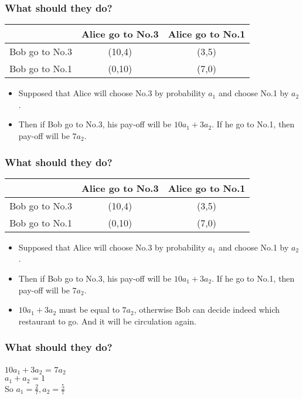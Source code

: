 \documentclass{beamer}
\begin{document}
\begin{frame}
\frametitle{What should they do?}
\begin{tabular}{|c|c|c|}
\hline
\hline
    & {\color{red}Alice} go to No.3 & {\color{red}Alice} go to No.1\\
\hline
{\color{blue}Bob} go to No.3 & ({\color{blue}10},{\color{red}4}) & ({\color{blue}3},{\color{red}5})\\
\hline
{\color{blue}Bob} go to No.1 & ({\color{blue}0},{\color{red}10}) & ({\color{blue}7},{\color{red}0})\\
\hline
\hline
\end{tabular}
\begin{itemize}
\item Supposed that Alice will choose No.3 by probability $a_1$ and choose No.1 by $a_2$.
\item Then if Bob go to No.3, his pay-off will be $10a_1+3a_2$. If he go to No.1, then pay-off will be $7a_2$.
\end{itemize}
\end{frame}

\begin{frame}
\frametitle{What should they do?}
\begin{tabular}{|c|c|c|}
\hline
\hline
    & {\color{red}Alice} go to No.3 & {\color{red}Alice} go to No.1\\
\hline
{\color{blue}Bob} go to No.3 & ({\color{blue}10},{\color{red}4}) & ({\color{blue}3},{\color{red}5})\\
\hline
{\color{blue}Bob} go to No.1 & ({\color{blue}0},{\color{red}10}) & ({\color{blue}7},{\color{red}0})\\
\hline
\hline
\end{tabular}
\begin{itemize}
\item Supposed that Alice will choose No.3 by probability $a_1$ and choose No.1 by $a_2$.
\item Then if Bob go to No.3, his pay-off will be $10a_1+3a_2$. If he go to No.1, then pay-off will be $7a_2$.
\item $10a_1+3a_2$ must be equal to $7a_2$, otherwise Bob can decide indeed which restaurant to go. And it will be circulation again.\\
\end{itemize}
\end{frame}

\begin{frame}
\frametitle{What should they do?}
        \qquad $10a_1+3a_2$ = $7a_2$ \\
        \qquad $a_1 + a_2 = 1$ \\
        \qquad So $a_1 = \frac{2}{7}, a_2 = \frac{5}{7}$
\end{frame}
\end{document}
